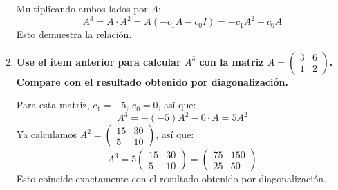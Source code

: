 \begin{prob}
\begin{enumerate}[$a)$]
\begin{myproof}
Multiplicando ambos lados por $A$:
\[
A^3 = A \cdot A^2 = A(-c_1A - c_0I) = -c_1A^2 - c_0A
\]
Esto demuestra la relación.
\end{myproof}
\item \textbf{Use el ítem anterior para calcular $A^3$ con la matriz $A = \begin{pmatrix} 3 & 6 \\ 1 & 2 \end{pmatrix}$. Compare con el resultado obtenido por diagonalización.}
\begin{myproof}
Para esta matriz, $c_1 = -5$, $c_0 = 0$, así que:
\[
A^3 = -(-5)A^2 - 0 \cdot A = 5A^2
\]
Ya calculamos $A^2 = \begin{pmatrix} 15 & 30 \\ 5 & 10 \end{pmatrix}$, así que:
\[
A^3 = 5 \begin{pmatrix} 15 & 30 \\ 5 & 10 \end{pmatrix} = \begin{pmatrix} 75 & 150 \\ 25 & 50 \end{pmatrix}
\]
Esto coincide exactamente con el resultado obtenido por diagonalización.
\end{myproof}
\end{enumerate}
\end{prob}


